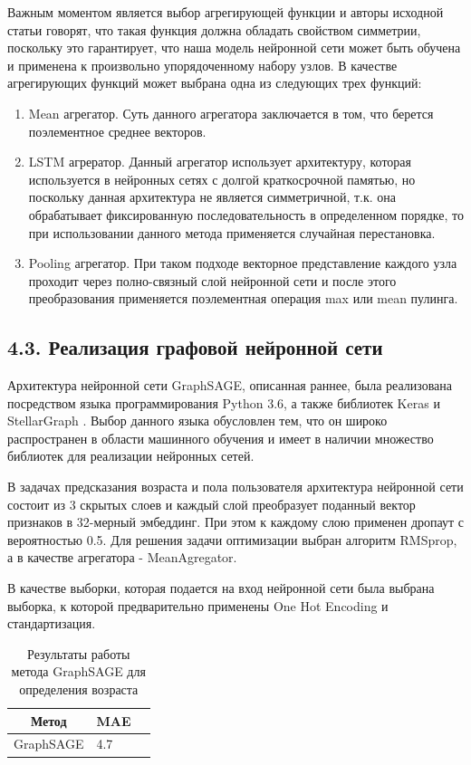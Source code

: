 Важным моментом является выбор агрегирующей функции и авторы исходной статьи говорят, что такая функция должна обладать свойством симметрии, поскольку это гарантирует, что наша модель нейронной сети может быть обучена и применена к произвольно упорядоченному набору узлов. В качестве агрегирующих функций может выбрана одна из следующих трех функций:
\begin{enumerate}
\item Mean агрегатор. Суть данного агрегатора заключается в том, что берется поэлементное среднее векторов.
\item LSTM агрератор. Данный агрегатор использует архитектуру, которая используется в нейронных сетях с долгой краткосрочной памятью, но поскольку данная архитектура не является симметричной, т.к. она обрабатывает фиксированную последовательность в определенном порядке, то при использовании данного метода применяется случайная перестановка.
\item Pooling агрегатор.  При таком подходе векторное представление каждого узла проходит через полно-связный слой нейронной сети и после этого преобразования применяется поэлементная операция max или mean пулинга.
\end{enumerate}

\subsection{4.3. Реализация графовой нейронной сети}

Архитектура нейронной сети GraphSAGE, описанная раннее, была реализована посредством языка программирования Python 3.6, а также  библиотек Keras \cite{keras} и StellarGraph \cite{stellargraph}. Выбор данного языка обусловлен тем, что он широко распространен в области машинного обучения и имеет в наличии множество библиотек для реализации нейронных сетей. 

В задачах предсказания возраста и пола пользователя архитектура нейронной сети состоит из 3 скрытых слоев и каждый слой преобразует поданный вектор признаков в 32-мерный эмбеддинг. При этом к каждому слою применен дропаут с вероятностью 0.5. Для решения задачи оптимизации выбран алгоритм RMSprop, а в качестве агрегатора - MeanAgregator.

В качестве выборки, которая подается на вход нейронной сети была выбрана выборка, к которой предварительно применены One Hot Encoding и стандартизация.


\begin{table}[b]
\centering
\begin{tabular}{|l|l|l|}
\hline
\multicolumn{1}{|c|}{\textbf{Метод}} & \multicolumn{1}{c|}{\textbf{MAE}}  \\ \hline
GraphSAGE                        &               4.7                                                              \\ \hline
\end{tabular}
\caption{Результаты работы метода GraphSAGE для определения возраста}
\label{graphsage age table}
\end{table}

